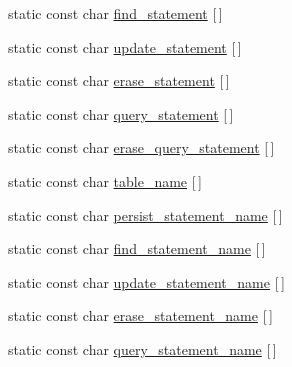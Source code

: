 \begin{DoxyCompactItemize}
\item 
static const char \hyperlink{classodb_1_1access_1_1object__traits__impl_3_01_1_1_graph_class_00_01id__pgsql_01_4_aecbe9db8da26b6cbf8948155cb1aceee}{find\+\_\+statement} \mbox{[}$\,$\mbox{]}
\item 
static const char \hyperlink{classodb_1_1access_1_1object__traits__impl_3_01_1_1_graph_class_00_01id__pgsql_01_4_abc4978cdb8f71ffa48798cc357854fbd}{update\+\_\+statement} \mbox{[}$\,$\mbox{]}
\item 
static const char \hyperlink{classodb_1_1access_1_1object__traits__impl_3_01_1_1_graph_class_00_01id__pgsql_01_4_aaa14bc846408fe97b5fa9236e9d6b99f}{erase\+\_\+statement} \mbox{[}$\,$\mbox{]}
\item 
static const char \hyperlink{classodb_1_1access_1_1object__traits__impl_3_01_1_1_graph_class_00_01id__pgsql_01_4_a49140f1ff5b75b41f321fba0f4184472}{query\+\_\+statement} \mbox{[}$\,$\mbox{]}
\item 
static const char \hyperlink{classodb_1_1access_1_1object__traits__impl_3_01_1_1_graph_class_00_01id__pgsql_01_4_af7eea3738e903c6451d3f4ba06925ada}{erase\+\_\+query\+\_\+statement} \mbox{[}$\,$\mbox{]}
\item 
static const char \hyperlink{classodb_1_1access_1_1object__traits__impl_3_01_1_1_graph_class_00_01id__pgsql_01_4_a98fe8be9522d009de7945bbe7bcf3a16}{table\+\_\+name} \mbox{[}$\,$\mbox{]}
\item 
static const char \hyperlink{classodb_1_1access_1_1object__traits__impl_3_01_1_1_graph_class_00_01id__pgsql_01_4_a94ad7855c39d1a04c55f2f86b919dbbf}{persist\+\_\+statement\+\_\+name} \mbox{[}$\,$\mbox{]}
\item 
static const char \hyperlink{classodb_1_1access_1_1object__traits__impl_3_01_1_1_graph_class_00_01id__pgsql_01_4_a10cca1b74fc55a02807c910ab87c0669}{find\+\_\+statement\+\_\+name} \mbox{[}$\,$\mbox{]}
\item 
static const char \hyperlink{classodb_1_1access_1_1object__traits__impl_3_01_1_1_graph_class_00_01id__pgsql_01_4_a233bbbf595cf585975b9d9aef7fa1ccf}{update\+\_\+statement\+\_\+name} \mbox{[}$\,$\mbox{]}
\item 
static const char \hyperlink{classodb_1_1access_1_1object__traits__impl_3_01_1_1_graph_class_00_01id__pgsql_01_4_a8c4ac443aad9aca90447b34635783dbf}{erase\+\_\+statement\+\_\+name} \mbox{[}$\,$\mbox{]}
\item 
static const char \hyperlink{classodb_1_1access_1_1object__traits__impl_3_01_1_1_graph_class_00_01id__pgsql_01_4_a5add07b0e636421c05a587bdbb9aa27a}{query\+\_\+statement\+\_\+name} \mbox{[}$\,$\mbox{]}

\end{DoxyCompactItemize}
